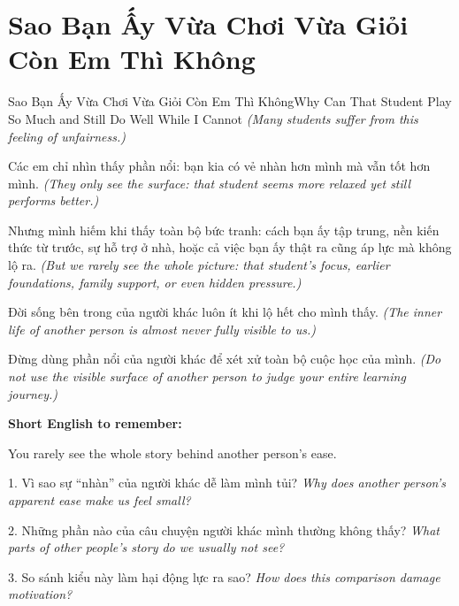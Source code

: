 \section{Sao Bạn Ấy Vừa Chơi Vừa Giỏi Còn Em Thì Không}
\begin{truyen}{Sao Bạn Ấy Vừa Chơi Vừa Giỏi Còn Em Thì Không}{Why Can That Student Play So Much and Still Do Well While I Cannot}
\textit{(Many students suffer from this feeling of unfairness.)}

Các em chỉ nhìn thấy phần nổi: bạn kia có vẻ nhàn hơn mình mà vẫn tốt hơn mình.
\textit{(They only see the surface: that student seems more relaxed yet still performs better.)}

Nhưng mình hiếm khi thấy toàn bộ bức tranh: cách bạn ấy tập trung, nền kiến thức từ trước, sự hỗ trợ ở nhà, hoặc cả việc bạn ấy thật ra cũng áp lực mà không lộ ra.
\textit{(But we rarely see the whole picture: that student's focus, earlier foundations, family support, or even hidden pressure.)}

Đời sống bên trong của người khác luôn ít khi lộ hết cho mình thấy.
\textit{(The inner life of another person is almost never fully visible to us.)}
\end{truyen}

\begin{baihoc}
Đừng dùng phần nổi của người khác để xét xử toàn bộ cuộc học của mình.
\textit{(Do not use the visible surface of another person to judge your entire learning journey.)}
\end{baihoc}

\begin{ghinhoanh}
\textbf{Short English to remember:}

You rarely see the whole story behind another person's ease.

\end{ghinhoanh}

\begin{tuhocnhanh}
1. Vì sao sự “nhàn” của người khác dễ làm mình tủi? \textit{Why does another person's apparent ease make us feel small?}

2. Những phần nào của câu chuyện người khác mình thường không thấy? \textit{What parts of other people's story do we usually not see?}

3. So sánh kiểu này làm hại động lực ra sao? \textit{How does this comparison damage motivation?}
\end{tuhocnhanh}
\ngancach

